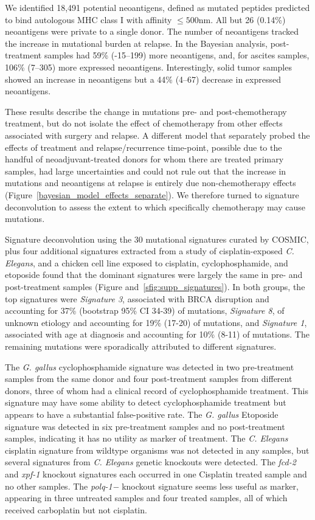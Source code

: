 We identified 18,491 potential neoantigens, defined as mutated peptides predicted to bind autologous MHC class I with affinity $\leq 500$nm. All but 26 (0.14\%) neoantigens were private to a single donor. The number of neoantigens tracked the increase in mutational burden at relapse. In the Bayesian analysis, post-treatment samples had 59\% (-15--199) more neoantigens, and, for ascites samples, 106\% (7--305) more expressed neoantigens. Interestingly, solid tumor samples showed an increase in neoantigens but a 44\% (4--67) decrease in expressed neoantigens.

These results describe the change in mutations pre- and post-chemotherapy treatment, but do not isolate the effect of chemotherapy from other effects associated with surgery and relapse. A different model that separately probed the effects of treatment and relapse/recurrence time-point, possible due to the handful of neoadjuvant-treated donors for whom there are treated primary samples, had large uncertainties and could not rule out that the increase in mutations and neoantigens at relapse is entirely due non-chemotherapy effects (Figure~\ref{bayesian_model_effects_separate}). We therefore turned to signature deconvolution to assess the extent to which specifically chemotherapy may cause mutations.

Signature deconvolution using the 30 mutational signatures curated by COSMIC\cite{364242}, plus four additional signatures extracted from a study of cisplatin-exposed \textit{C. Elegans}\cite{Meier_2014}, and a chicken cell line exposed to cisplatin, cyclophosphamide, and etoposide\cite{Szikriszt_2016} found that the dominant signatures were largely the same in pre- and post-treatment samples (Figure and~\ref{sfig:supp_signatures}). In both groups, the top signatures were \textit{Signature 3}, associated with BRCA disruption and accounting for 37\% (bootstrap 95\% CI 34-39) of mutations, \textit{Signature 8}, of unknown etiology and accounting for 19\% (17-20) of mutations, and \textit{Signature 1}, associated with age at diagnosis and accounting for 10\% (8-11) of mutations. The remaining mutations were sporadically attributed to different signatures.

The \textit{G. gallus} cyclophosphamide signature was detected in two pre-treatment samples from the same donor and four post-treatment samples from different donors, three of whom had a clinical record of cyclophosphamide treatment. This signature may have some ability to detect cyclophosphamide treatment but appears to have a substantial false-positive rate. The \textit{G. gallus} Etoposide signature was detected in six pre-treatment samples and no post-treatment samples, indicating it has no utility as marker of treatment. The \textit{C. Elegans} cisplatin signature from wildtype organisms was not detected in any samples, but several signatures from \textit{C. Elegans} genetic knockouts were detected. The \textit{fcd-2} and \textit{xpf-1} knockout signatures each occurred in one Cisplatin treated sample and no other samples. The \textit{polq-1−} knockout signature seems less useful as marker, appearing in three untreated samples and four treated samples, all of which received carboplatin but not cisplatin.

